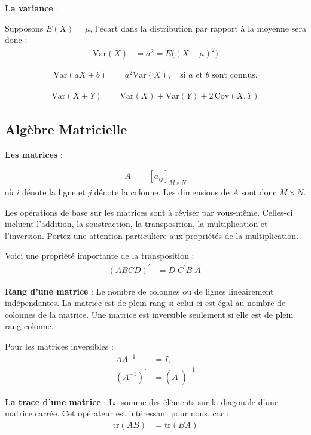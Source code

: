 \documentclass[14pt]{extarticle} %
\begin{document}
\textbf{La variance} :

Supposons \(E(X) = \mu\), l’écart dans la distribution par rapport à la moyenne sera donc :
\begin{align*}
    \text{Var}(X) &= \sigma^2 = E\bigl((X - \mu)^2\bigr)
\end{align*}

\begin{align*}
    \text{Var}(aX + b) &= a^2 \text{Var}(X), \quad \text{si } a \text{ et } b \text{ sont connus.}
\end{align*}

\begin{align*}
    \text{Var}(X + Y) &= \text{Var}(X) + \text{Var}(Y) + 2 \,\text{Cov}(X, Y)
\end{align*}

\subsection{Algèbre Matricielle}

\textbf{Les matrices} :

\begin{align*}
    A &= [a_{ij}]_{M \times N}
\end{align*}
où \(i\) dénote la ligne et \(j\) dénote la colonne. Les dimensions de \(A\) sont donc 
\(M \times N\).

Les opérations de base sur les matrices sont à réviser par vous-même. Celles-ci incluent 
l’addition, la soustraction, la transposition, la multiplication et l’inversion. Portez une 
attention particulière aux propriétés de la multiplication.

Voici une propriété importante de la transposition :
\begin{align*}
    (ABCD)^{\prime} &= D^{\prime}C^{\prime}B^{\prime}A^{\prime}
\end{align*}

\textbf{Rang d’une matrice} : Le nombre de colonnes ou de lignes linéairement indépendantes. 
La matrice est de plein rang si celui-ci est égal au nombre de colonnes de la matrice. 
Une matrice est inversible seulement si elle est de plein rang colonne.

Pour les matrices inversibles :
\begin{align*}
    A A^{-1} &= I, \\
    (A^{-1})^{\prime} &= (A^{\prime})^{-1}
\end{align*}

\textbf{La trace d’une matrice} : La somme des éléments sur la diagonale d’une matrice carrée. 
Cet opérateur est intéressant pour nous, car :
\begin{align*}
    \text{tr}(AB) &= \text{tr}(BA)
\end{align*}
\end{document}
